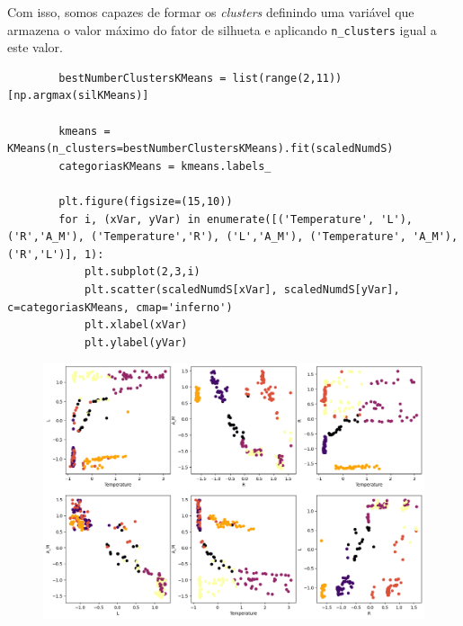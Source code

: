 Com isso, somos capazes de formar os \textit{clusters} definindo uma variável que armazena o valor máximo do fator de silhueta e aplicando \verb|n_clusters| igual a este valor.
\begin{longlisting}
    \begin{verbatim}
        bestNumberClustersKMeans = list(range(2,11))[np.argmax(silKMeans)]

        kmeans = KMeans(n_clusters=bestNumberClustersKMeans).fit(scaledNumdS)
        categoriasKMeans = kmeans.labels_
        
        plt.figure(figsize=(15,10))
        for i, (xVar, yVar) in enumerate([('Temperature', 'L'), ('R','A_M'), ('Temperature','R'), ('L','A_M'), ('Temperature', 'A_M'), ('R','L')], 1):
            plt.subplot(2,3,i)
            plt.scatter(scaledNumdS[xVar], scaledNumdS[yVar], c=categoriasKMeans, cmap='inferno')
            plt.xlabel(xVar)
            plt.ylabel(yVar)
    \end{verbatim}
\end{longlisting}
\begin{figure}[H]
    \centering
    \includegraphics[width=1\linewidth]{figures/KMeans.png}
\end{figure}
